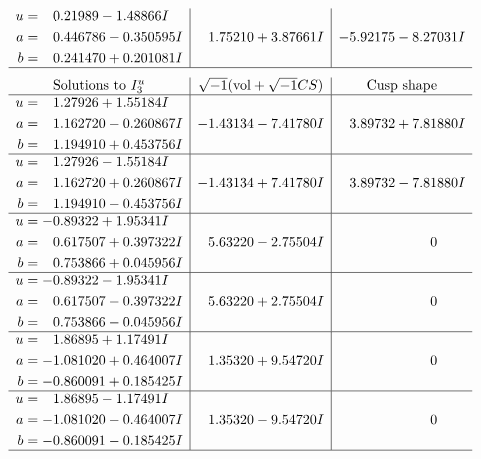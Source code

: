 \documentclass[1p]{elsarticle_modified}
\theoremstyle{definition}
\newcommand{\I}{\sqrt{-1}}
\begin{document}
$$\begin{array}{c|c|c}
\begin{aligned}
u &= \phantom{-}0.21989 - 1.48866 I \\
a &= \phantom{-}0.446786 - 0.350595 I \\
b &= \phantom{-}0.241470 + 0.201081 I\end{aligned}
 & \phantom{-}1.75210 + 3.87661 I & -5.92175 - 8.27031 I\\
 \hline 
 \end{array}$$\newpage$$\begin{array}{c|c|c}  
\text{Solutions to }I^u_{3}& \I (\text{vol} + \sqrt{-1}CS) & \text{Cusp shape}\\
 \hline 
\begin{aligned}
u &= \phantom{-}1.27926 + 1.55184 I \\
a &= \phantom{-}1.162720 - 0.260867 I \\
b &= \phantom{-}1.194910 + 0.453756 I\end{aligned}
 & -1.43134 - 7.41780 I & \phantom{-}3.89732 + 7.81880 I \\ \hline\begin{aligned}
u &= \phantom{-}1.27926 - 1.55184 I \\
a &= \phantom{-}1.162720 + 0.260867 I \\
b &= \phantom{-}1.194910 - 0.453756 I\end{aligned}
 & -1.43134 + 7.41780 I & \phantom{-}3.89732 - 7.81880 I \\ \hline\begin{aligned}
u &= -0.89322 + 1.95341 I \\
a &= \phantom{-}0.617507 + 0.397322 I \\
b &= \phantom{-}0.753866 + 0.045956 I\end{aligned}
 & \phantom{-}5.63220 - 2.75504 I & \phantom{-0.000000 } 0 \\ \hline\begin{aligned}
u &= -0.89322 - 1.95341 I \\
a &= \phantom{-}0.617507 - 0.397322 I \\
b &= \phantom{-}0.753866 - 0.045956 I\end{aligned}
 & \phantom{-}5.63220 + 2.75504 I & \phantom{-0.000000 } 0 \\ \hline\begin{aligned}
u &= \phantom{-}1.86895 + 1.17491 I \\
a &= -1.081020 + 0.464007 I \\
b &= -0.860091 + 0.185425 I\end{aligned}
 & \phantom{-}1.35320 + 9.54720 I & \phantom{-0.000000 } 0 \\ \hline\begin{aligned}
u &= \phantom{-}1.86895 - 1.17491 I \\
a &= -1.081020 - 0.464007 I \\
b &= -0.860091 - 0.185425 I\end{aligned}
 & \phantom{-}1.35320 - 9.54720 I & \phantom{-0.000000 } 0\\
 \hline 
 \end{array}$$\newpage\newpage\renewcommand{\arraystretch}{1}
\end{document}
